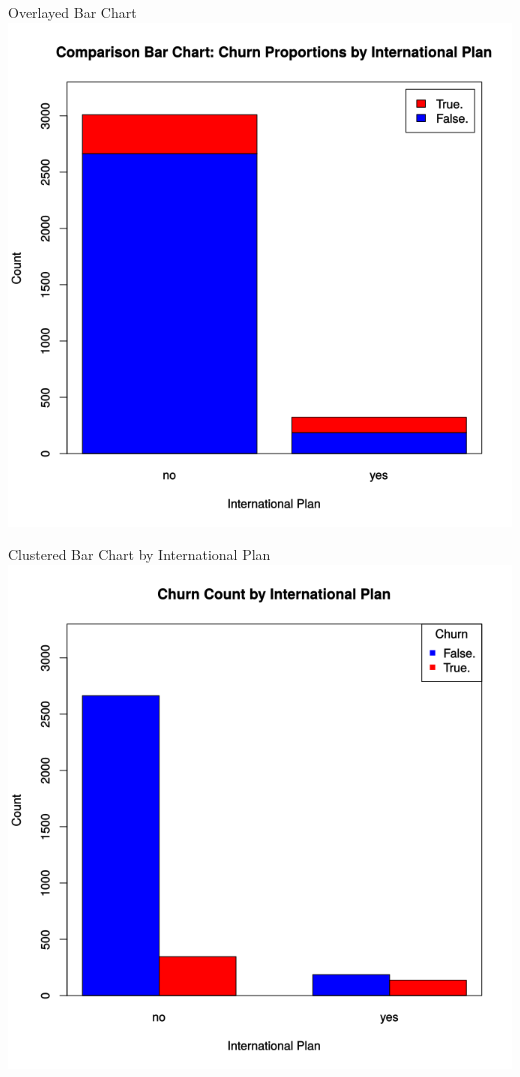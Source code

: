 \documentclass[handout]{beamer}
\begin{document}
\begin{frame}{Overlayed Bar Chart}
    \centering
    \includegraphics[height=\textheight]{images/overlay-churn-international}
\end{frame}

\begin{frame}{Clustered Bar Chart by International Plan}
    \centering
    \includegraphics[height=\textheight]{images/cluster-by-international}
\end{frame}
\end{document}
